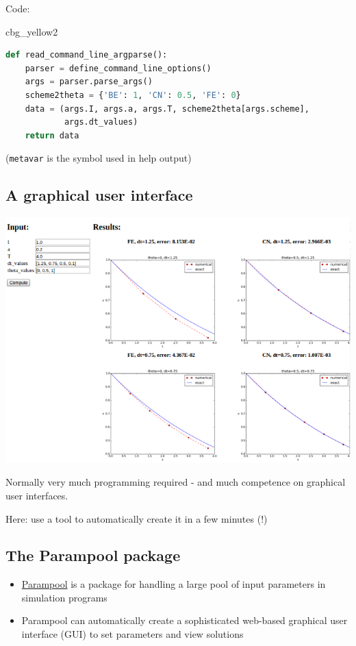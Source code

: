 \documentclass[%
oneside,                 %
final,                   %
10pt]{article}
\newenvironment{_cod_tight}[1]{
   \def\FrameCommand{\colorbox{#1}}
   \FrameRule0.6pt\MakeFramed {\FrameRestore}\vskip3mm}
   {\vskip0mm\endMakeFramed}
\newenvironment{cod}[1]{
\bgroup\rmfamily
\fboxsep=0mm\relax
\begin{_cod_tight}{#1}
\list{}{\parsep=-2mm\parskip=0mm\topsep=0pt\leftmargin=2mm
\rightmargin=2\leftmargin\leftmargin=4pt\relax}
\item\relax}
{\endlist\end{_cod_tight}\egroup}
\begin{document}
Code:

\begin{cod}{cbg_yellow2}\begin{lstlisting}[language=Python,style=simple,xleftmargin=2mm]
def read_command_line_argparse():
    parser = define_command_line_options()
    args = parser.parse_args()
    scheme2theta = {'BE': 1, 'CN': 0.5, 'FE': 0}
    data = (args.I, args.a, args.T, scheme2theta[args.scheme],
            args.dt_values)
    return data
\end{lstlisting}\end{cod}
\noindent

(\texttt{metavar} is the symbol used in help output)


\subsection*{A graphical user interface}



\centerline{\includegraphics[width=1.0\linewidth]{fig-softeng/web_GUI.png}}



Normally very much programming required - and much competence on
graphical user interfaces.

Here: use a tool to automatically create it in a few minutes (!)

\subsection*{The Parampool package}

\begin{itemize}
 \item \href{{https://github.com/hplgit/parampool}}{Parampool} is a package
   for handling a large pool of input parameters in simulation programs

 \item Parampool can automatically create a sophisticated web-based
   graphical user interface (GUI) to set parameters and view solutions
\end{itemize}
\end{document}
